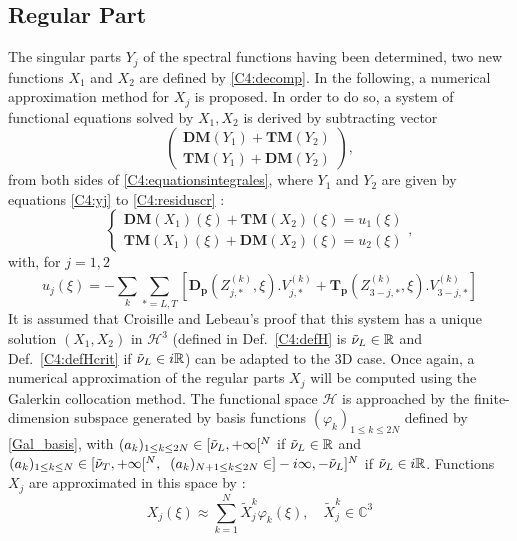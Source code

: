\subsection{Regular Part}
\label{C4:regpart}
The singular parts $Y_j$ of the spectral functions having been determined, two new functions $X_1$ and $X_2$ are defined by \eqref{C4:decomp}. In the following, a numerical approximation method for $X_j$ is proposed. In order to do so, a system of functional equations solved by $X_1, X_2$ is derived by subtracting vector 
\begin{equation}
\begin{pmatrix}
\textbf{DM}(Y_1)+\textbf{TM}(Y_2) \\
\textbf{TM}(Y_1)+\textbf{DM}(Y_2)
\end{pmatrix},
\end{equation}
from both sides of \eqref{C4:equationsintegrales}, where $Y_1$ and $Y_2$ are given by equations \eqref{C4:yj} to \eqref{C4:residuscr} :
\begin{equation}
\left\{ 
\begin{matrix}
\mathbf{DM}(X_1)(\xi)+\textbf{TM}(X_2)(\xi)=u_1(\xi)\\
\textbf{TM}(X_1)(\xi)+\textbf{DM}(X_2)(\xi)=u_2(\xi)
\end{matrix}
\right.,
\label{C4:regparteqn}
\end{equation}
with, for $j=1,2$
\begin{equation}
u_j(\xi)=-\sum_k \sum_{*=L,T} \left[ \mathbf{D_p}(Z_{j,*}^{(k)},\xi).V_{j,*}^{(k)}+\mathbf{T_p}(Z_{3-j,*}^{(k)},\xi).V_{3-j,*}^{(k)}\right]
\label{C4:scndmembre}
\end{equation}
It is assumed that Croisille and Lebeau's \cite{CroisilleLebeau} proof that this system has a unique solution $(X_1,X_2)$ in $\mathcal{H}^3$ (defined in Def.~\ref{C4:defH} is $\tilde{\nu}_L \in \mathbb{R}$ and Def.~\ref{C4:defHcrit} if $\tilde{\nu}_L \in i\mathbb{R}$) can be adapted to the 3D case. Once again, a numerical approximation of the regular parts $X_j$ will be computed using the Galerkin collocation method. The functional space $\mathcal{H}$ is approached by the finite-dimension subspace generated by basis functions $(\varphi_k)_{1 \leq k \leq 2N}$ defined by \eqref{Gal_basis}, with $(a_k)_{1 \leq k \leq 2N} \in \lbrack \tilde{\nu}_L, + \infty \lbrack^N$ if $\tilde{\nu}_L \in \mathbb{R}$ and $(a_k)_{1 \leq k \leq N} \in \lbrack \tilde{\nu}_T, + \infty \lbrack^N ,\; \; (a_k)_{N+1\leq k \leq 2N} \in \rbrack -i\infty, -\tilde{\nu}_L\rbrack^N$ if $\tilde{\nu}_L \in i\mathbb{R}$. Functions $X_j$ are approximated in this space by :
\begin{equation}
 X_j(\xi) \approx \sum_{k=1}^N \tilde{X}_j^k \varphi_k(\xi) ,\hspace{1em} \tilde{X}_j^k \in \mathbb{C}^3
 \label{C4:Xj}
\end{equation}

